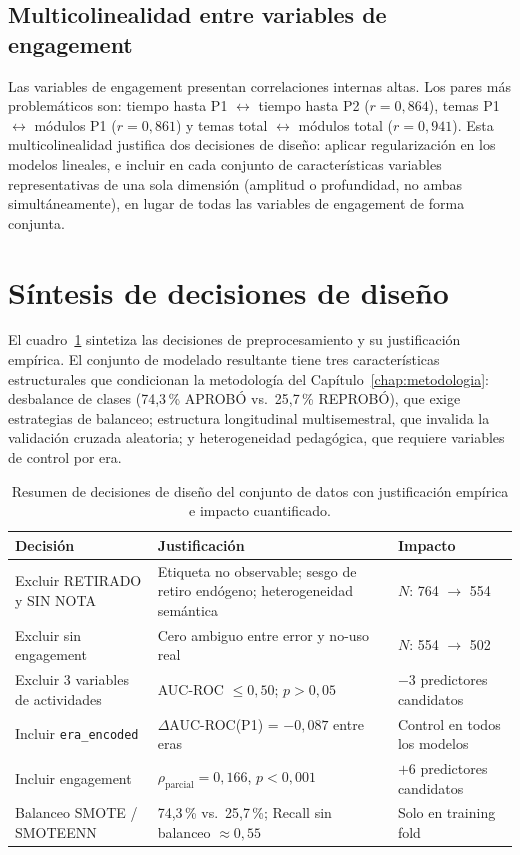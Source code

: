 \documentclass[12pt, letterpaper, openany]{report}
\begin{document}
\FloatBarrier

\subsection{Multicolinealidad entre variables de engagement}

Las variables de engagement presentan correlaciones internas altas. Los pares más problemáticos son: tiempo hasta P1 $\leftrightarrow$ tiempo hasta P2 ($r = 0{,}864$), temas P1 $\leftrightarrow$ módulos P1 ($r = 0{,}861$) y temas total $\leftrightarrow$ módulos total ($r = 0{,}941$). Esta multicolinealidad justifica dos decisiones de diseño: aplicar regularización en los modelos lineales, e incluir en cada conjunto de características variables representativas de una sola dimensión (amplitud o profundidad, no ambas simultáneamente), en lugar de todas las variables de engagement de forma conjunta.

\section{Síntesis de decisiones de diseño}

El cuadro~\ref{tab:resumen_decisiones} sintetiza las decisiones de preprocesamiento y su justificación empírica. El conjunto de modelado resultante tiene tres características estructurales que condicionan la metodología del Capítulo~\ref{chap:metodologia}: desbalance de clases (74,3\,\% APROBÓ vs.\ 25,7\,\% REPROBÓ), que exige estrategias de balanceo; estructura longitudinal multisemestral, que invalida la validación cruzada aleatoria; y heterogeneidad pedagógica, que requiere variables de control por era.

\begin{table}[htbp]
  \centering
  \caption{Resumen de decisiones de diseño del conjunto de datos con justificación empírica e impacto cuantificado.}
  \label{tab:resumen_decisiones}
  \small
  \begin{tabular}{p{3.4cm}p{5.2cm}p{4.6cm}}
    \toprule
    Decisión & Justificación & Impacto \\
    \midrule
    Excluir RETIRADO y SIN NOTA
      & Etiqueta no observable; sesgo de retiro endógeno; heterogeneidad semántica
      & $N$: 764 $\to$ 554 \\[3pt]
    Excluir sin engagement
      & Cero ambiguo entre error y no-uso real
      & $N$: 554 $\to$ 502 \\[3pt]
    Excluir 3 variables de actividades
      & AUC-ROC $\leq 0{,}50$; $p > 0{,}05$
      & $-3$ predictores candidatos \\[3pt]
    Incluir \texttt{era\_encoded}
      & $\Delta$AUC-ROC(P1) = $-0{,}087$ entre eras
      & Control en todos los modelos \\[3pt]
    Incluir engagement
      & $\rho_\text{parcial} = 0{,}166$, $p < 0{,}001$
      & $+6$ predictores candidatos \\[3pt]
    Balanceo SMOTE / SMOTEENN
      & 74,3\,\% vs.\ 25,7\,\%; Recall sin balanceo $\approx 0{,}55$
      & Solo en training fold \\
    \bottomrule
  \end{tabular}
\end{table}
\end{document}
